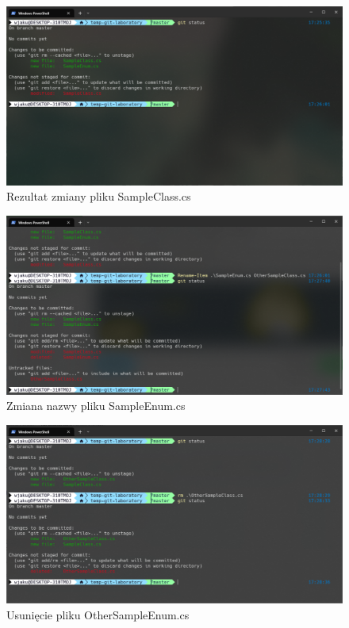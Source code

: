 \documentclass{article}
\begin{document}
\vspace*{\fill}
\begin{figure}[!h]
    \caption{Rezultat zmiany pliku SampleClass.cs }
    \centerline{\includegraphics [scale=0.5]{sampleClass-modifited.PNG}}
    \label{fig:label}
\end{figure}
\vspace*{\fill}

\newpage

\vspace*{\fill}
\begin{figure}[!h]
    \caption{Zmiana nazwy pliku SampleEnum.cs }
    \centerline{\includegraphics [scale=0.5]{rename-enum.PNG}}
    \label{fig:label}
\end{figure}
\vspace*{\fill}

\newpage

\vspace*{\fill}
\begin{figure}[!h]
    \caption{Usunięcie pliku OtherSampleEnum.cs }
    \centerline{\includegraphics [scale=0.5]{remove-otherSampleClass.PNG}}
    \label{fig:label}
\end{figure}
\vspace*{\fill}
\newpage
\end{document}
